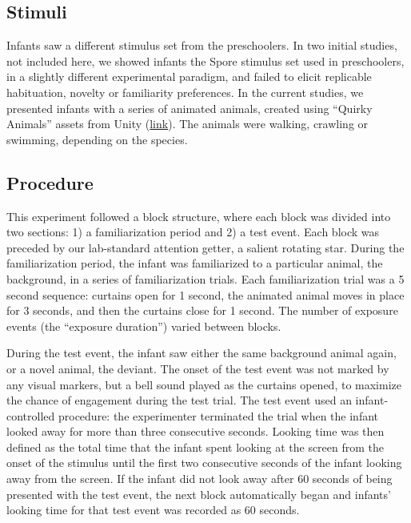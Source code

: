 \documentclass[10pt, letterpaper]{article}
\begin{document}
\hypertarget{stimuli-1}{%
\subsection{Stimuli}\label{stimuli-1}}

Infants saw a different stimulus set from the preschoolers. In two
initial studies, not included here, we showed infants the Spore stimulus
set used in preschoolers, in a slightly different experimental paradigm,
and failed to elicit replicable habituation, novelty or familiarity
preferences. In the current studies, we presented infants with a series
of animated animals, created using ``Quirky Animals'' assets from Unity
(\href{https://tinyurl.com/469xxrn7}{link}). The animals were walking,
crawling or swimming, depending on the species.

\hypertarget{procedure}{%
\subsection{Procedure}\label{procedure}}

This experiment followed a block structure, where each block was divided
into two sections: 1) a familiarization period and 2) a test event. Each
block was preceded by our lab-standard attention getter, a salient
rotating star. During the familiarization period, the infant was
familiarized to a particular animal, the background, in a series of
familiarization trials. Each familiarization trial was a 5 second
sequence: curtains open for 1 second, the animated animal moves in place
for 3 seconds, and then the curtains close for 1 second. The number of
exposure events (the ``exposure duration'') varied between blocks.

During the test event, the infant saw either the same background animal
again, or a novel animal, the deviant. The onset of the test event was
not marked by any visual markers, but a bell sound played as the
curtains opened, to maximize the chance of engagement during the test
trial. The test event used an infant-controlled procedure: the
experimenter terminated the trial when the infant looked away for more
than three consecutive seconds. Looking time was then defined as the
total time that the infant spent looking at the screen from the onset of
the stimulus until the first two consecutive seconds of the infant
looking away from the screen. If the infant did not look away after 60
seconds of being presented with the test event, the next block
automatically began and infants' looking time for that test event was
recorded as 60 seconds.
\end{document}
